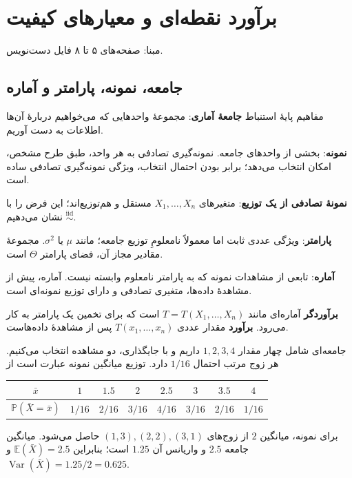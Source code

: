 \documentclass[12pt,a4paper,oneside]{report}
\newcounter{ex}[chapter]
\newenvironment{example}[1]{\refstepcounter{ex}\begin{tcolorbox}[breakable=false,title={مثال \thechapter.\arabic{ex} | #1},colframe=muted,colback=white]}{\end{tcolorbox}}
\newcommand{\source}[1]{\par{\small\color{muted} مبنا: صفحه‌های #1 فایل دست‌نویس.}\par}
\newcommand{\E}{\mathbb E}
\newcommand{\Var}{\operatorname{Var}}
\newcommand{\iid}{\overset{\mathrm{iid}}{\sim}}
\newcommand{\Prob}{\mathbb P}
\begin{document}
\chapter{برآورد نقطه‌ای و معیارهای کیفیت}
\source{۵ تا ۸}
\section{جامعه، نمونه، پارامتر و آماره}
\begin{definition}{مفاهیم پایهٔ استنباط}
\textbf{جامعهٔ آماری}: مجموعهٔ واحدهایی که می‌خواهیم دربارهٔ آن‌ها اطلاعات به دست آوریم.

\textbf{نمونه}: بخشی از واحدهای جامعه. نمونه‌گیری تصادفی به هر واحد، طبق طرح مشخص، امکان انتخاب می‌دهد؛ برابر بودن احتمال انتخاب، ویژگی نمونه‌گیری تصادفی ساده است.

\textbf{نمونهٔ تصادفی از یک توزیع}: متغیرهای $X_1,\ldots,X_n$ مستقل و هم‌توزیع‌اند؛ این فرض را با $\iid$ نشان می‌دهیم.

\textbf{پارامتر}: ویژگی عددی ثابت اما معمولاً نامعلومِ توزیع جامعه؛ مانند $\mu$ یا $\sigma^2$. مجموعهٔ مقادیر مجاز آن، فضای پارامتر $\Theta$ است.

\textbf{آماره}: تابعی از مشاهدات نمونه که به پارامتر نامعلوم وابسته نیست. آماره، پیش از مشاهدهٔ داده‌ها، متغیری تصادفی و دارای توزیع نمونه‌ای است.
\end{definition}
\textbf{برآوردگر} آماره‌ای مانند $T=T(X_1,\ldots,X_n)$ است که برای تخمین یک پارامتر به کار می‌رود. \textbf{برآورد} مقدار عددی $T(x_1,\ldots,x_n)$ پس از مشاهدهٔ داده‌هاست.
\begin{example}{توزیع نمونه‌ای میانگین}
جامعه‌ای شامل چهار مقدار $1,2,3,4$ داریم و با جایگذاری، دو مشاهده انتخاب می‌کنیم. هر زوج مرتب احتمال $1/16$ دارد. توزیع میانگین نمونه عبارت است از
\begin{center}\small
\begin{tabular}{c|ccccccc}
\toprule
$\bar x$&$1$&$1.5$&$2$&$2.5$&$3$&$3.5$&$4$\\
\midrule
$\Prob(\bar X=\bar x)$&$1/16$&$2/16$&$3/16$&$4/16$&$3/16$&$2/16$&$1/16$\\
\bottomrule
\end{tabular}\end{center}
برای نمونه، میانگین $2$ از زوج‌های $(1,3),(2,2),(3,1)$ حاصل می‌شود. میانگین جامعه $2.5$ و واریانس آن $1.25$ است؛ بنابراین $\E(\bar X)=2.5$ و $\Var(\bar X)=1.25/2=0.625$.
\end{example}
\end{document}
